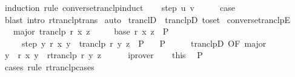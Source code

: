 \begin{isabellebody}
%
\isadelimproof
%
\endisadelimproof
%
\isatagproof
{}\isamarkupfalse%
\ {\isacharparenleft}{\kern0pt}induction\ rule{\isacharcolon}{\kern0pt}\ converse{\isacharunderscore}{\kern0pt}tranclp{\isacharunderscore}{\kern0pt}induct{\isacharparenright}{\kern0pt}\isanewline
\ \ \isamarkupfalse%
\ {\isacharparenleft}{\kern0pt}step\ u\ v{\isacharparenright}{\kern0pt}\isanewline
\ \ \isamarkupfalse%
\ \isamarkupfalse%
\ {\isacharquery}{\kern0pt}case\isanewline
\ \ \ \ \isamarkupfalse%
\ {\isacharparenleft}{\kern0pt}blast\ intro{\isacharcolon}{\kern0pt}\ rtranclp{\isacharunderscore}{\kern0pt}trans{\isacharparenright}{\kern0pt}\isanewline
{}\isamarkupfalse%
\ auto%
\endisatagproof
{\isafoldproof}%
%
\isadelimproof
\isanewline
%
\endisadelimproof
\isanewline
{}\isamarkupfalse%
\ tranclD\ {\isacharequal}{\kern0pt}\ tranclpD\ {\isacharbrackleft}{\kern0pt}to{\isacharunderscore}{\kern0pt}set{\isacharbrackright}{\kern0pt}\isanewline
\isanewline
{}\isamarkupfalse%
\ converse{\isacharunderscore}{\kern0pt}tranclpE{\isacharcolon}{\kern0pt}\isanewline
\ \ \ major{\isacharcolon}{\kern0pt}\ {\isachardoublequoteopen}tranclp\ r\ x\ z{\isachardoublequoteclose}\isanewline
\ \ \ \ \ base{\isacharcolon}{\kern0pt}\ {\isachardoublequoteopen}r\ x\ z\ {\isasymLongrightarrow}\ P{\isachardoublequoteclose}\isanewline
\ \ \ \ \ step{\isacharcolon}{\kern0pt}\ {\isachardoublequoteopen}{\isasymAnd}y{\isachardot}{\kern0pt}\ r\ x\ y\ {\isasymLongrightarrow}\ tranclp\ r\ y\ z\ {\isasymLongrightarrow}\ P{\isachardoublequoteclose}\isanewline
\ \ \ P\isanewline
%
\isadelimproof
%
\endisadelimproof
%
\isatagproof
{}\isamarkupfalse%
\ {\isacharminus}{\kern0pt}\isanewline
\ \ \isamarkupfalse%
\ tranclpD\ {\isacharbrackleft}{\kern0pt}OF\ major{\isacharbrackright}{\kern0pt}\ \isamarkupfalse%
\ y\ \ {\isachardoublequoteopen}r\ x\ y{\isachardoublequoteclose}\ \ {\isachardoublequoteopen}rtranclp\ r\ y\ z{\isachardoublequoteclose}\isanewline
\ \ \ \ \isamarkupfalse%
\ iprover\isanewline
\ \ \isamarkupfalse%
\ this{\isacharparenleft}{\kern0pt}{}{\isacharparenright}{\kern0pt}\ \isamarkupfalse%
\ P\isanewline
\ \ \isamarkupfalse%
\ {\isacharparenleft}{\kern0pt}cases\ rule{\isacharcolon}{\kern0pt}\ rtranclp{\isachardot}{\kern0pt}cases{\isacharparenright}{\kern0pt}\isanewline

\end{isabellebody}
